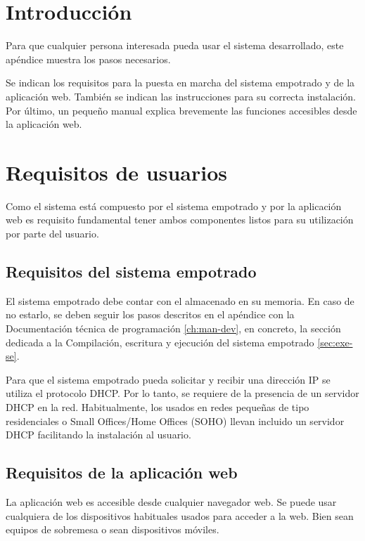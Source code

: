  \label{ch:man-user}



\section{Introducción} \label{sec:man-user-intro}
Para que cualquier persona interesada pueda usar el sistema desarrollado,
este apéndice muestra los pasos necesarios.

Se indican los requisitos para la puesta en marcha del sistema empotrado
y de la aplicación web. También se indican las instrucciones para su correcta
instalación. Por último, un pequeño manual explica brevemente las funciones
accesibles desde la aplicación web.



\section{Requisitos de usuarios} \label{sec:man-user-req}
Como el sistema está compuesto por el sistema empotrado y por la aplicación web
es requisito fundamental tener ambos componentes listos para su utilización
por parte del usuario.


\subsection{Requisitos del sistema empotrado} \label{sec:man-user-req-se}
El sistema empotrado debe contar con el \sw{} almacenado en su memoria. En caso
de no estarlo, se deben seguir los pasos descritos en el apéndice con la
Documentación técnica de programación \ref{ch:man-dev}, en concreto, la sección
dedicada a la Compilación, escritura y ejecución del sistema empotrado
\ref{sec:exe-se}.


Para que el sistema empotrado pueda solicitar y recibir una dirección IP se
utiliza el protocolo DHCP. Por lo tanto, se requiere de la presencia de un
servidor DHCP en la red. Habitualmente, los  usados
en redes pequeñas de tipo residenciales o Small Offices/Home Offices (SOHO)
llevan incluido un servidor DHCP facilitando la instalación al usuario.


\subsection{Requisitos de la aplicación web} \label{sec:man-user-req-aw}
La aplicación web es accesible desde cualquier navegador web. Se puede usar
cualquiera de los dispositivos habituales usados para acceder a la web. Bien
sean equipos de sobremesa o sean dispositivos móviles.

